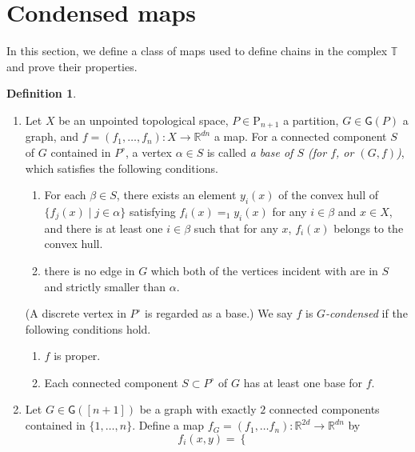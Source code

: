 \documentclass[reqno]{amsart}
\theoremstyle{definition}
\newtheorem{defi}{Definition}[section]
\theoremstyle{plain}
\newcommand{\TTH}{\mathbb{T}}%
\newcommand{\GG}{\mathsf{G}}%
\newcommand{\RR}{\mathbb{R}}
\newcommand{\PP}{\mathrm{P}} %
\begin{document}
\section{Condensed maps}\label{Scondensed}
In this section, we define a class of maps used to define chains in the  complex $\TTH$ and prove their properties. 
\begin{defi}\label{Dcondensed}

\begin{enumerate}
\item Let $X$ be an unpointed topological space, $P\in \PP_{n+1}$ a partition,  $G\in \GG(P)$  a graph, and  $f=(f_1,\dots, f_n):X\to \RR^{dn}$ a map. For a connected component $S$ of $G$ contained in $P^\circ$,   a vertex $\alpha\in S$ is called {\em a base of $S$ (for $f$, or $(G,f)$)}, which satisfies  the following conditions.
\begin{enumerate}
\item For each $\beta\in S$, there exists an element $y_i(x)$ of the convex hull of $\{f_j(x)\mid j\in \alpha\}$ satisfying $f_i(x)=_1y_i(x)$   for any $i\in \beta$ and $x\in X$, and there is at least one $i\in \beta$ such that for any $x$, $f_i(x)$ belongs to the convex hull.
\item there is no edge in $G$ which both of the vertices incident with  are in $S$ and strictly smaller than $\alpha$.
\end{enumerate}
(A discrete vertex in $P^\circ$ is regarded as a base.)
We say $f$ is {\em $G$-condensed} if the following conditions hold.
\begin{enumerate}
\item $f$ is proper. %
\item Each connected component $S\subset P^\circ$ of $G$ has at least one base for $f$.
\end{enumerate}
\item Let $G\in \GG([n+1])$ be a graph with exactly $2$ connected components contained in $\{1,\dots, n\}$. Define a map  $f_G=(f_1,\dots f_n):\RR^{2d}\to \RR^{dn}$ by
\[
f_i(x,y)=\left\{\begin{array}{cc}

\end{array}\]
\end{enumerate}
\end{defi}
\end{document}
